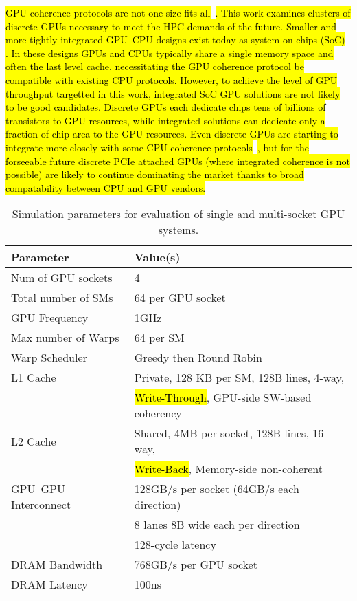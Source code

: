 \hl{GPU coherence protocols are not one-size fits all}~\cite{sinclair2015efficient, Power2013, ZiabariTACO-16}\hl{.  
This work examines clusters 
of discrete GPUs necessary to meet the HPC demands of the future.  Smaller and 
more tightly integrated GPU--CPU designs exist today as system on chips (SoC)}~\cite{AMDCARRIZO,INTELSKYLAKEINTEGRATED}
\hl{.
In these designs GPUs and CPUs typically share a single memory space and often 
the last level cache, necessitating the GPU coherence protocol be compatible 
with existing CPU protocols. However, to achieve the level of GPU throughput 
targetted in this work, integrated SoC GPU solutions are not likely to be good 
candidates.  Discrete GPUs each dedicate chips tens of billions of transistors 
to GPU resources, while integrated solutions can dedicate only a fraction of 
chip area to the GPU resources.  Even discrete GPUs are starting to integrate
more closely with some CPU coherence protocols}~\cite{agarwal2016selective,ZiabariTACO-16}\hl{,
but for the forseeable future discrete PCIe attached GPUs (where integrated coherence
is not possible) are likely to continue dominating the market thanks to broad compatability
between CPU and GPU vendors.}

\begin{table}[tp]
\begin{small}
\centering
\begin{tabular}{ll}
\toprule
\textbf{Parameter} & \textbf{Value(s)} \\
\toprule
Num of GPU sockets & 4 \\
\midrule
Total number of SMs & 64 per GPU socket \\
\midrule
GPU Frequency & 1GHz \\
\midrule
Max number of Warps & 64 per SM \\
\midrule
Warp Scheduler & Greedy then Round Robin \\
\midrule
L1 Cache & Private, 128 KB per SM, 128B lines, 4-way, \\ 
& \hl{Write-Through}, GPU-side SW-based coherency \\
\midrule
L2 Cache & Shared, 4MB per socket, 128B lines, 16-way, \\ 
& \hl{Write-Back}, Memory-side non-coherent\\
\midrule
GPU--GPU Interconnect & 128GB/s per socket (64GB/s each direction) \\
& 8 lanes 8B wide each per direction \\
&128-cycle latency \\
\midrule
DRAM Bandwidth & 768GB/s per GPU socket\\
\midrule
DRAM Latency & 100ns \\
\toprule
\end{tabular}
\vspace{-.1in}
\caption{Simulation parameters for evaluation of single and multi-socket GPU 
systems.}
\vspace{-.2in}
\label{tab:setup}
\end{small}
\end{table} 

